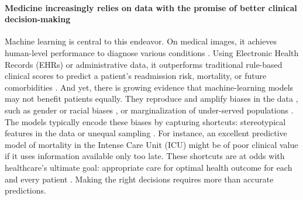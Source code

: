 \documentclass[french,12pt,twoside,a4paper]{book}
\begin{document}

\label{subsec:causal_tuto:synthetic_materials}%


\paragraph{Medicine increasingly relies on data with the promise of better
  clinical decision-making} Machine learning is central to this endeavor.
On medical images, it achieves human-level performance to
diagnose various conditions
\citep{aggarwal2021diagnostic,esteva2021deep,liu2019comparison}.
Using Electronic Health Records (EHRs) or administrative data, it
outperforms traditional rule-based clinical scores to predict a patient's
readmission risk, mortality, or future comorbidities
\citep{rajkomar2018scalable,li2020behrt,beaulieu2021machine}.
%
And yet, there is growing evidence that machine-learning models may not benefit
patients equally. They reproduce and amplify biases in the data
\citep{rajkomar2018ensuring}, such as gender or racial biases
\citep{singh2022generalizability,gichoya2022ai,roosli2022peeking}, or
marginalization of under-served populations \citep{seyyed2021underdiagnosis}.
The models typically encode these biases by capturing shortcuts: stereotypical
features in the data or unequal sampling
\citep{geirhos2020shortcut,winkler2019association,degrave2021ai}.
%
For instance, an excellent predictive model of mortality in the Intense Care Unit
(ICU) might be of poor clinical value if it uses information available
only too late.
%
These shortcuts are at odds with healthcare's ultimate goal: appropriate care
for optimal health outcome for each and every patient
\citep{cma_policy_appropriateness_2015, ghassemi2020review}. Making the right decisions requires more than accurate predictions.
\end{document}
